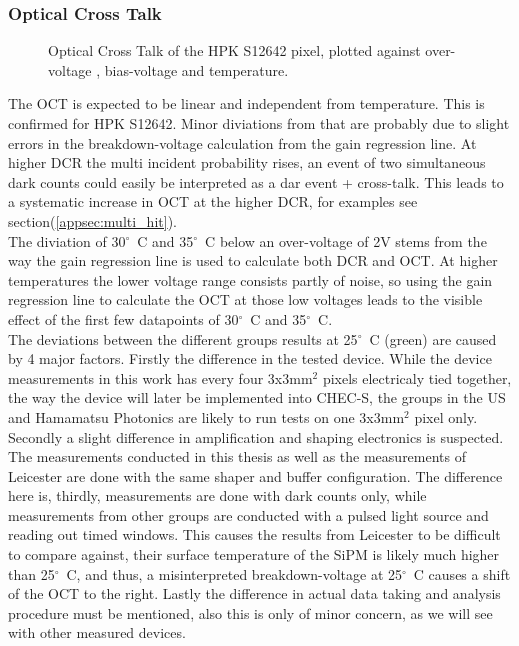 \documentclass[12pt,article,type=msc,colorback,accentcolor=tud9c]{tudthesis}
\begin{document}
\subsubsection{Optical Cross Talk}
\begin{figure}[h]
\begin{centering}
\caption[CHEC-S OCT]{Optical Cross Talk of the HPK S12642 pixel, plotted against over-voltage , bias-voltage and temperature.}
\label{fig:S12642_OCT}
\end{centering}
\end{figure}
The OCT is expected to be linear and independent from temperature. This is confirmed for HPK S12642. Minor diviations from that are probably due to slight errors in the breakdown-voltage calculation from the gain regression line. At higher DCR the multi incident probability rises, an event of two simultaneous dark counts could easily be interpreted as a dar event + cross-talk. This leads to a systematic increase in OCT at the higher DCR, for examples see section(\ref{appsec:multi_hit}).\\
The diviation of 30${^\circ}$~C and 35${^\circ}$~C below an over-voltage of 2V stems from the way the gain regression line is used to calculate both DCR and OCT. At higher temperatures the lower voltage range consists partly of noise, so using the gain regression line to calculate the OCT at those low voltages leads to the visible effect of the first few datapoints of 30${^\circ}$~C and 35${^\circ}$~C. \\
The deviations between the different groups results at 25${^\circ}$~C (green) are caused by 4 major factors. Firstly the difference in the tested device. While the device measurements in this work has every four 3x3mm$^2$ pixels electricaly tied together, the way the device will later be implemented into CHEC-S, the groups in the US\cite{US_CHECS} and Hamamatsu Photonics\cite{HPK_SiPM} are likely to run tests on one 3x3mm$^2$ pixel only. Secondly a slight difference in amplification and shaping electronics is suspected. The measurements conducted in this thesis as well as the measurements of Leicester are done with the same shaper and buffer configuration. The difference here is, thirdly, measurements are done with dark counts only, while measurements from other groups are conducted with a pulsed light source and reading out timed windows. This causes the results from Leicester to be difficult to compare against, their surface temperature of the SiPM is likely much higher than 25${^\circ}$~C, and thus, a misinterpreted breakdown-voltage at 25${^\circ}$~C causes a shift of the OCT to the right. Lastly the difference in actual data taking and analysis procedure must be mentioned, also this is only of minor concern, as we will see with other measured devices.
\end{document}
